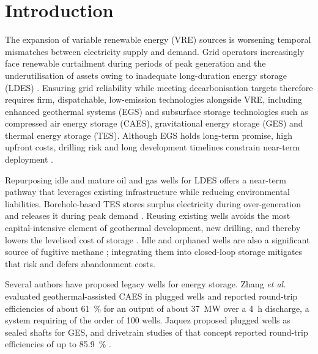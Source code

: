 \section{Introduction}
\label{sec:intro}

The expansion of variable renewable energy (VRE) sources is worsening
temporal mismatches between electricity supply and demand. Grid operators
increasingly face renewable curtailment during periods of peak generation and
the underutilisation of assets owing to inadequate long-duration energy
storage (LDES) \cite{denholm2021,iea2020}. Ensuring grid reliability while
meeting decarbonisation targets therefore requires firm, dispatchable,
low-emission technologies alongside VRE, including enhanced geothermal
systems (EGS) and subsurface storage technologies such as compressed air
energy storage (CAES), gravitational energy storage (GES) and thermal energy
storage (TES). Although EGS holds long-term promise, high upfront costs,
drilling risk and long development timelines constrain near-term deployment
\cite{doe2006,doe2019}.

Repurposing idle and mature oil and gas wells for LDES offers a near-term
pathway that leverages existing infrastructure while reducing environmental
liabilities. Borehole-based TES stores surplus electricity during
over-generation and releases it during peak demand \cite{bartling2025}.
Reusing existing wells avoids the most capital-intensive element of
geothermal development, new drilling, and thereby lowers the levelised cost
of storage \cite{santos2022,higgins2024}. Idle and orphaned wells are also a
significant source of fugitive methane \cite{kang2014,williams2021,Santos2025};
integrating them into closed-loop storage mitigates that risk and defers
abandonment costs.

Several authors have proposed legacy wells for energy storage. Zhang
\textit{et al.}\ \cite{Zhang2025} evaluated geothermal-assisted CAES in
plugged wells and reported round-trip efficiencies of about \SI{61}{\percent}
for an output of about \SI{37}{\mega\watt} over a \SI{4}{\hour} discharge, a
system requiring of the order of 100 wells. Jaquez \cite{Jaquez2021} proposed
plugged wells as sealed shafts for GES, and drivetrain studies of that concept
reported round-trip efficiencies of up to \SI{85.9}{\percent}
\cite{Sundeep}.

